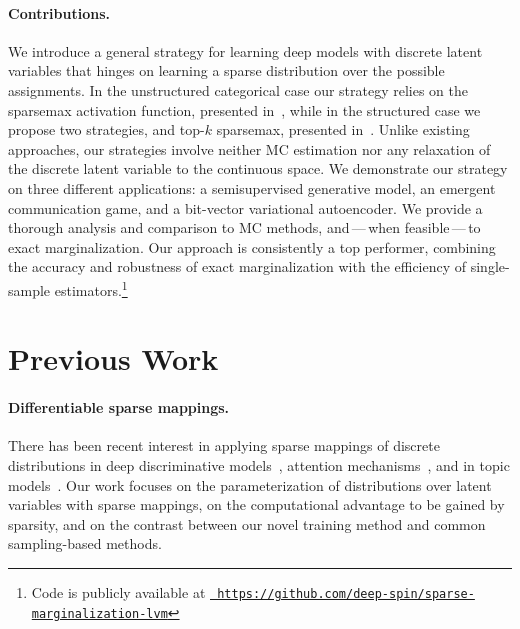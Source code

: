 \paragraph*{Contributions.} We introduce a general strategy for
learning deep models with discrete latent variables that hinges on
learning a sparse distribution over the possible assignments. In the
unstructured categorical case our strategy relies on the sparsemax
activation function, presented in~, while in the
structured case we propose two strategies, \smap and top-$k$
sparsemax, presented in~. Unlike existing
approaches, our strategies involve neither MC estimation nor any
relaxation of the discrete latent variable to the continuous space.
We demonstrate our strategy on three different applications: a
semisupervised generative model, an emergent communication game, and
a bit-vector variational autoencoder. We provide a thorough analysis
and comparison to MC methods, and\,---\,when feasible\,---\,to exact
marginalization. Our approach is consistently a top performer,
combining the accuracy and robustness of exact marginalization with
the efficiency of single-sample estimators.\footnote{Code is publicly
    available at
    \href{https://github.com/deep-spin/sparse-marginalization-lvm}{\tt
        https://github.com/deep-spin/sparse-marginalization-lvm}}

\section{Previous Work}

\paragraph*{Differentiable sparse mappings.} There has been recent
interest in applying sparse mappings of discrete distributions in
deep discriminative models~\citep{martins2016softmax,
    niculae2018sparsemap, fusedmax, entmax, sparsemapcg}, attention
mechanisms~\citep{malaviya2018sparse, shao2019ssn,
    maruf2019selective, correia2019adaptively}, and in topic
models~\citep{caothesis}. Our work focuses on the parameterization of
distributions over latent variables with sparse mappings, on the
computational advantage to be gained by sparsity, and on the contrast
between our novel training method and common sampling-based methods.

